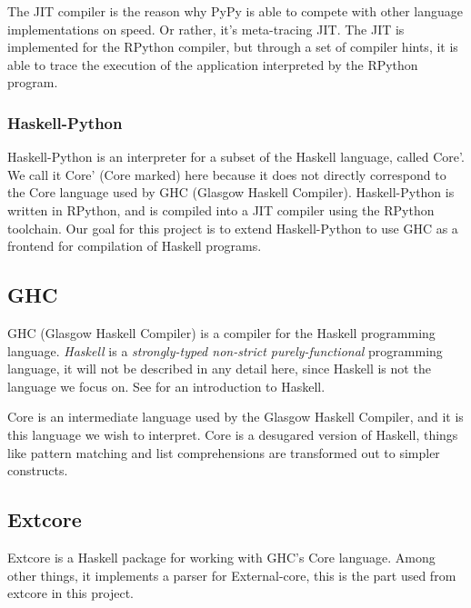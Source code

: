 The JIT compiler is the reason why PyPy is able to compete with other language implementations
on speed. Or rather, it's meta-tracing JIT. The JIT is implemented
for the RPython compiler, but through a set of compiler hints, it is able to trace the 
execution of the application interpreted by the RPython program.

\subsubsection{Haskell-Python}

Haskell-Python is an interpreter for a subset of the Haskell language, called Core'.
We call it Core' (Core marked) here because it does not directly correspond to 
the Core language
used by GHC (Glasgow Haskell Compiler). Haskell-Python is written in RPython,
and is compiled into a JIT compiler using the RPython toolchain. Our goal for this
project is to extend Haskell-Python to use GHC as a frontend for compilation 
of Haskell programs.

\subsection{GHC}

GHC (Glasgow Haskell Compiler) is a compiler for the Haskell programming language.
\emph{Haskell} is a \emph{strongly-typed non-strict purely-functional} 
programming language, it will not be described in any detail here, since 
Haskell is not the language we focus on. See \cite{hudak1992report}
for an introduction to Haskell. 

Core is an intermediate language used by the Glasgow Haskell Compiler\cite{ghc},
and it is this language we wish to interpret. Core is a desugared version of Haskell, 
things like pattern matching
and list comprehensions are transformed out to simpler constructs.\cite{jones1994compilation}

\subsection{Extcore}

Extcore is a Haskell package for working with GHC's Core language. Among other things,
it implements a parser for External-core, this is the part used from extcore in this project.


